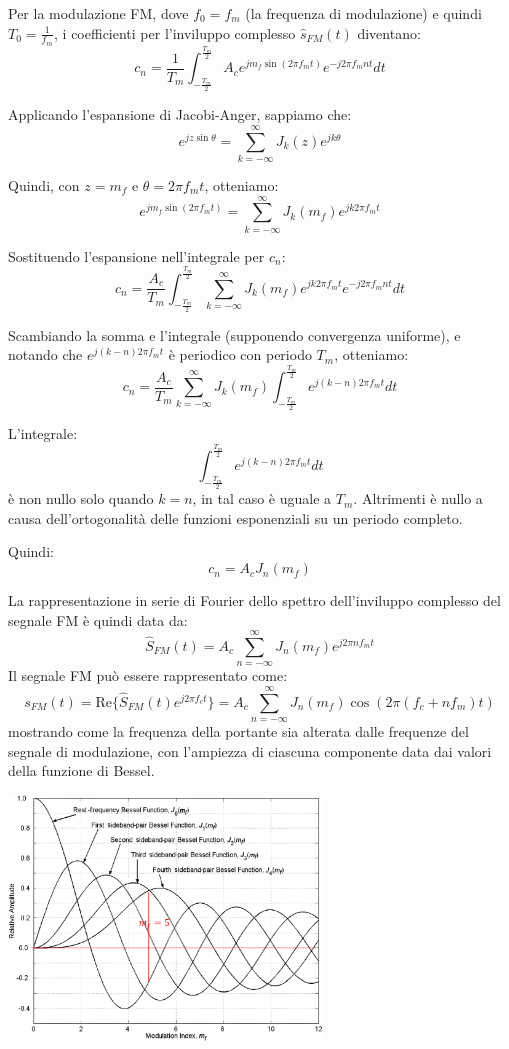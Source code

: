 Per la modulazione FM, dove \( f_0 = f_m \) (la frequenza di modulazione) e quindi \( T_0 = \frac{1}{f_m} \), i coefficienti per l'inviluppo complesso \( \hat{s}_{FM}(t) \) diventano:
\[ c_n = \frac{1}{T_m} \int_{-\frac{T_m}{2}}^{\frac{T_m}{2}} A_c e^{j m_f \sin(2\pi f_m t)} e^{-j 2\pi f_m n t} dt \]

Applicando l'espansione di Jacobi-Anger, sappiamo che:
\[ e^{j z \sin \theta} = \sum_{k=-\infty}^\infty J_k(z) e^{j k \theta} \]

Quindi, con \( z = m_f \) e \( \theta = 2\pi f_m t \), otteniamo:
\[ e^{j m_f \sin(2\pi f_m t)} = \sum_{k=-\infty}^\infty J_k(m_f) e^{j k 2\pi f_m t} \]


Sostituendo l'espansione nell'integrale per \( c_n \):
\[ c_n = \frac{A_c}{T_m} \int_{-\frac{T_m}{2}}^{\frac{T_m}{2}} \sum_{k=-\infty}^\infty J_k(m_f) e^{j k 2\pi f_m t} e^{-j 2\pi f_m n t} dt \]

Scambiando la somma e l'integrale (supponendo convergenza uniforme), e notando che \( e^{j (k-n) 2\pi f_m t} \) è periodico con periodo \( T_m \), otteniamo:
\[ c_n = \frac{A_c}{T_m} \sum_{k=-\infty}^\infty J_k(m_f) \int_{-\frac{T_m}{2}}^{\frac{T_m}{2}} e^{j (k-n) 2\pi f_m t} dt \]



L'integrale:
\[ \int_{-\frac{T_m}{2}}^{\frac{T_m}{2}} e^{j (k-n) 2\pi f_m t} dt \]
è non nullo solo quando \( k = n \), in tal caso è uguale a \( T_m \). Altrimenti è nullo a causa dell'ortogonalità delle funzioni esponenziali su un periodo completo.


Quindi:
\[ c_n = A_c J_n(m_f) \]





La rappresentazione in serie di Fourier dello spettro dell'inviluppo complesso del segnale FM è quindi data da:
\[
\hat{S}_{FM}(t) = A_c \sum_{n=-\infty}^{\infty} J_n(m_f) e^{j 2\pi n f_m t}
\]
Il segnale FM può essere rappresentato come:
\[
s_{FM}(t) = \text{Re}\{ \hat{S}_{FM}(t) e^{j 2\pi f_c t} \} = A_c \sum_{n=-\infty}^{\infty} J_n(m_f) \cos(2\pi (f_c + n f_m) t)
\]
mostrando come la frequenza della portante sia alterata dalle frequenze del segnale di modulazione, con l'ampiezza di ciascuna componente data dai valori della funzione di Bessel.
\begin{center}
    \includegraphics[width=0.625\textwidth]{imgs/bessel1.png}
\end{center}


